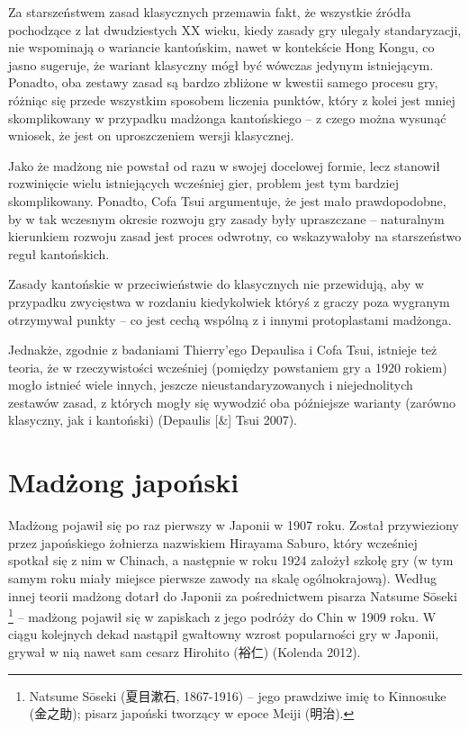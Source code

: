 Za starszeństwem zasad klasycznych przemawia fakt, że wszystkie źródła
pochodzące z lat dwudziestych XX wieku, kiedy zasady gry ulegały standaryzacji,
nie wspominają o wariancie kantońskim, nawet w kontekście Hong Kongu,
co jasno sugeruje, że wariant klasyczny mógł być wówczas jedynym istniejącym.
Ponadto, oba zestawy zasad są bardzo zbliżone w kwestii samego procesu gry,
różniąc się przede wszystkim sposobem liczenia punktów, który z kolei jest mniej
skomplikowany w przypadku madżonga kantońskiego -- z czego można wysunąć
wniosek, że jest on uproszczeniem wersji klasycznej.

Jako że madżong nie powstał od razu w swojej docelowej formie, lecz stanowił
rozwinięcie wielu istniejących wcześniej gier, problem jest tym bardziej
skomplikowany. Ponadto, Cofa Tsui argumentuje, że jest mało prawdopodobne, by w
tak wczesnym okresie rozwoju gry zasady były upraszczane -- naturalnym
kierunkiem rozwoju zasad jest proces odwrotny, co wskazywałoby na starszeństwo
reguł kantońskich.

Zasady kantońskie w przeciwieństwie do klasycznych nie przewidują, aby w
przypadku zwycięstwa w rozdaniu kiedykolwiek któryś z graczy poza wygranym
otrzymywał punkty -- co jest cechą wspólną z  i innymi
protoplastami madżonga. 

Jednakże, zgodnie z badaniami Thierry'ego Depaulisa i Cofa Tsui, istnieje też
teoria, że w rzeczywistości wcześniej (pomiędzy powstaniem gry a 1920 rokiem)
mogło istnieć wiele innych, jeszcze nieustandaryzowanych i niejednolitych
zestawów zasad, z których mogły się wywodzić oba późniejsze warianty (zarówno
klasyczny, jak i kantoński) (Depaulis [\&] Tsui 2007).

\section{Madżong japoński}
Madżong pojawił się po raz pierwszy w Japonii w 1907 roku. Został przywieziony
przez japońskiego żołnierza nazwiskiem Hirayama Saburo, który wcześniej spotkał
się z nim w Chinach, a następnie w roku 1924 założył szkołę gry (w tym samym
roku miały miejsce pierwsze zawody na skalę ogólnokrajową). Według innej teorii
madżong dotarł do Japonii za pośrednictwem pisarza Natsume Sōseki
\footnote{Natsume Sōseki (夏目漱石, 1867-1916) -- jego prawdziwe imię to Kinnosuke (金之助); pisarz
japoński tworzący w epoce Meiji (明治).} -- madżong pojawił się w zapiskach z jego
podróży do Chin w 1909 roku. W ciągu kolejnych dekad nastąpił gwałtowny wzrost
popularności gry w Japonii, grywał w nią nawet sam cesarz Hirohito (裕仁)
(Kolenda 2012).

